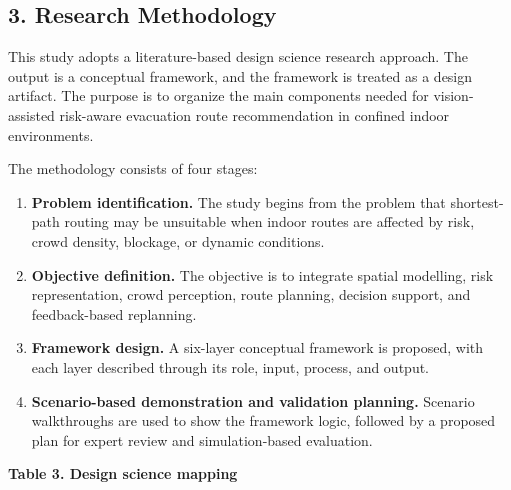 \documentclass[
]{article}
\providecommand{\tightlist}{%
  \setlength{\itemsep}{0pt}\setlength{\parskip}{0pt}}
\begin{document}
\subsection{3. Research Methodology}\label{research-methodology}

This study adopts a literature-based design science research approach.
The output is a conceptual framework, and the framework is treated as a
design artifact. The purpose is to organize the main components needed
for vision-assisted risk-aware evacuation route recommendation in
confined indoor environments.

The methodology consists of four stages:

\begin{enumerate}
\def\labelenumi{\arabic{enumi}.}
\tightlist
\item
  \textbf{Problem identification.} The study begins from the problem
  that shortest-path routing may be unsuitable when indoor routes are
  affected by risk, crowd density, blockage, or dynamic conditions.
\item
  \textbf{Objective definition.} The objective is to integrate spatial
  modelling, risk representation, crowd perception, route planning,
  decision support, and feedback-based replanning.
\item
  \textbf{Framework design.} A six-layer conceptual framework is
  proposed, with each layer described through its role, input, process,
  and output.
\item
  \textbf{Scenario-based demonstration and validation planning.}
  Scenario walkthroughs are used to show the framework logic, followed
  by a proposed plan for expert review and simulation-based evaluation.
\end{enumerate}

\textbf{Table 3. Design science mapping}
\end{document}
